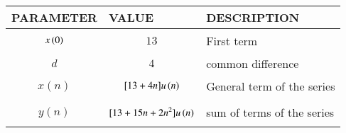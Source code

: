 \footnotesize
\begin{tabular}{|p{2cm}|p{2.5cm}|p{2.3cm}|}
    \hline
    PARAMETER & VALUE & DESCRIPTION  \\ \hline
    $$x\left(0\right)$$ & $$13$$ & First term \\ \hline
    $$d$$ & $$4$$ & common difference \\ \hline
    $$x(n)$$ & $$[13+4n]u\left(n\right)$$ & General term of the series  \\ \hline
    $$y(n)$$ & $$[13+15n+2n^2]u\left(n\right)$$ & sum of terms of the series\\ \hline
  \end{tabular}
